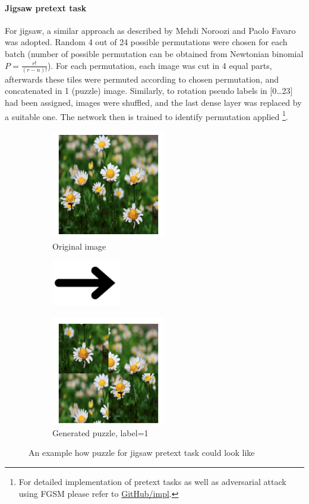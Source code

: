 \paragraph{Jigsaw pretext task}For jigsaw,
a similar approach as described by Mehdi Noroozi and Paolo Favaro~\cite{DBLP:journals/corr/NorooziF16} was adopted.
Random 4 out of 24 possible permutations were chosen for each batch (number of possible permutation can be obtained from Newtonian binomial $P=\frac{r!}{(r-n)!}$).
For each permutation, each image was cut in 4 equal parts,
afterwards these tiles were permuted according to chosen permutation, and concatenated in 1 (puzzle) image.
Similarly, to rotation pseudo labels in [0\ldots23] had been assigned,
images were shuffled, and the last dense layer was replaced by a suitable one.
The network then is trained to identify permutation applied \footnote{
    For detailed implementation of pretext tasks as well as adversarial attack \\ using FGSM please refer to \href{https://github.com/Goofy-Goof/ISS/blob/33a2ad40b779ff230aae31c29d2edc2cf5d90406/impl}{GitHub/impl}.
}.
\\
\begin{figure}[h]
    \begin{subfigure}{0.33\textwidth}
        \caption{Original image}
        \includegraphics[width=5cm]{images/dandelion}
    \end{subfigure}
    \begin{subfigure}{0.2\textwidth}
        \includegraphics[width=3cm]{images/arrow}
    \end{subfigure}
    \begin{subfigure}{0.33\textwidth}
        \caption{Generated puzzle, label=1}
        \includegraphics[width=5cm]{images/puzzle}
    \end{subfigure}
    \caption{An example how puzzle for jigsaw pretext task could look like}
\end{figure}

